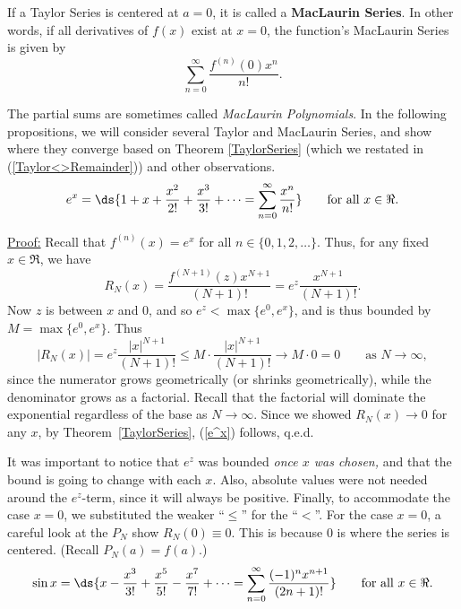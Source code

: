 \begin{comment}
\bigskip

For each of the above functions, we get a range of $x$-values
for which the remainders of the Taylor Polynomials shrink to
zero, and hence the Taylor Polynomials converge to the function
in that range of $x$'s.  We can therefore equate the function
with the relevant Taylor Series (\ref{TaylorSeries}).  
We point out here a note of terminology for a  special case of 
the Taylor Series is the
case where $a=0$ in (\ref{TaylorSeries}).  In this case the
series is called the {\it MacLaurin Series} for $f(x)$. 
\end{comment}
\begin{definition} If a Taylor Series is centered at $a=0$, it is called
a \linebreak
{\bf MacLaurin Series}.  In other words, if 
all derivatives of $f(x)$ exist at $x=0$,
the function's MacLaurin Series is given by
\begin{equation}\sum_{n=0}^\infty \frac{f^{(n)}(0)x^n}{n!}.\end{equation}
\end{definition}
The partial sums are sometimes called {\it MacLaurin Polynomials}.
In the following propositions, we will consider several Taylor
and MacLaurin Series, 
and show where they converge based on Theorem \ref{TaylorSeries}
(which we restated in (\ref{Taylor<>Remainder})) and
other observations.
\bprop
\begin{equation}
e^x=\ds{1+x+\frac{x^2}{2!}+\frac{x^3}{3!}+\cdots
        =\sum_{n=0}^\infty\frac{x^n}{n!}}
	\qquad\text{for all }x\in\Re.\label{e^x}\end{equation} 
\eprop 

\underline{Proof:} Recall that $f^{(n)}(x)=e^x$ for all $n\in\{0,1,2,\dots\}$.
Thus, for any fixed $x\in\Re$, we have 
$$R_N(x)=\frac{f^{(N+1)}(z)x^{N+1}}{(N+1)!}
=e^z\frac{x^{N+1}}{(N+1)!}.$$
Now $z$ is between $x$ and $0$, and so $e^z<\max\{e^0,e^x\}$, and
is thus bounded by $M=\max\{e^0,e^x\}$. Thus
$$|R_N(x)|=e^z\frac{|x|^{N+1}}{(N+1)!}\le M\cdot\frac{|x|^{N+1}}{(N+1)!}
\longrightarrow M\cdot 0=0\qquad\text{as }N\to\infty,$$   
since the numerator grows geometrically (or shrinks geometrically),
while the denominator grows as a factorial.  Recall that the
factorial will dominate the exponential regardless of the base
as $N\to\infty$.  
Since we showed $R_N(x)\to 0$ for any $x$, by Theorem~\ref{TaylorSeries}, 
(\ref{e^x}) follows, q.e.d.

It was important to notice that $e^z$ was bounded 
{\it once $x$ was chosen, }and that the bound is going to change
with each $x$.  Also, absolute values were not needed around
the $e^z$-term, since it will always be positive.  Finally, 
to accommodate the case $x=0$, we substituted the weaker
``$\le$'' for the ``$<$''.  For the case $x=0$, a careful look at
the $P_N$ show $R_N(0)\equiv0$.  This is because $0$ is where
the series is centered. (Recall $P_N(a)=f(a)$.) 
\bprop
\begin{equation}
\sin x=\ds{x-\frac{x^3}{3!}+\frac{x^5}{5!}-\frac{x^7}{7!}+\cdots
        =\sum_{n=0}^\infty\frac{(-1)^{n}x^{n+1}}{(2n+1)!}}
\qquad\text{for all }x\in\Re.
\label{sin x}
\end{equation}
\eprop 

